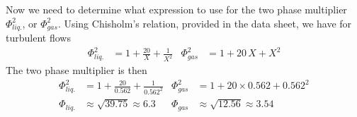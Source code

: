 \documentclass[calculator,datasheet,handbook]{exam}
\begin{document}
\begin{question}
\begin{enumerate}[a)]
\begin{enumerate}[i)]
{        Now we need to determine what expression to use for the two
        phase multiplier $\Phi^2_{liq.}$, or $\Phi^2_{gas}$. Using
        Chisholm's relation, provided in the data sheet, we have for
        turbulent flows
        \begin{align*}
          \Phi^2_{liq.} &= 1 + \frac{20}{X}+\frac{1}{X^2} &
          \Phi^2_{gas} &= 1 + 20\,X + X^2
        \end{align*}
        The two phase multiplier is then
        \begin{align*}
          \Phi_{liq.}^2 &= 1 + \frac{20}{0.562}+\frac{1}{0.562^2}
          & \Phi_{gas}^2 &= 1 + 20\times0.562+0.562^2\\
          \Phi_{liq.}&\approx \sqrt{39.75}\approx 6.3 &
          \Phi_{gas}&\approx \sqrt{12.56}\approx 3.54
        \end{align*}
      }
%
%        
    \end{enumerate}      
  \end{enumerate}
\end{question}
\end{document}
